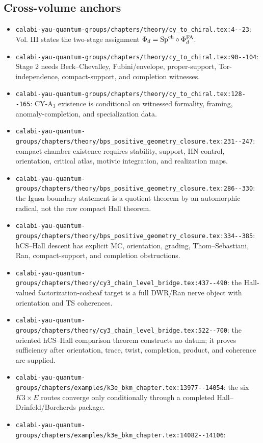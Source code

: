 \subsection{Cross-volume anchors}

\begin{itemize}
\item \verb|calabi-yau-quantum-groups/chapters/theory/cy_to_chiral.tex:4--23|:
Vol. III states the two-stage assignment
\(\Phi_d=\mathrm{Sp}^{\mathrm{ch}}\circ\Phi^{\mathrm{FA}}_d\).
\item \verb|calabi-yau-quantum-groups/chapters/theory/cy_to_chiral.tex:90--104|:
Stage 2 needs Beck--Chevalley, Fubini/envelope, proper-support,
Tor-independence, compact-support, and completion witnesses.
\item \verb|calabi-yau-quantum-groups/chapters/theory/cy_to_chiral.tex:128--165|:
CY-A\(_3\) existence is conditional on witnessed formality, framing,
anomaly-completion, and specialization data.
\item \verb|calabi-yau-quantum-groups/chapters/theory/bps_positive_geometry_closure.tex:231--247|:
compact chamber existence requires stability, support, HN control,
orientation, critical atlas, motivic integration, and realization maps.
\item \verb|calabi-yau-quantum-groups/chapters/theory/bps_positive_geometry_closure.tex:286--330|:
the Igusa boundary statement is a quotient theorem by an automorphic
radical, not the raw compact Hall theorem.
\item \verb|calabi-yau-quantum-groups/chapters/theory/bps_positive_geometry_closure.tex:334--385|:
hCS--Hall descent has explicit MC, orientation, grading,
Thom--Sebastiani, Ran, compact-support, and completion obstructions.
\item \verb|calabi-yau-quantum-groups/chapters/theory/cy3_chain_level_bridge.tex:437--490|:
the Hall-valued factorization-cosheaf target is a full DWR/Ran nerve
object with orientation and TS coherences.
\item \verb|calabi-yau-quantum-groups/chapters/theory/cy3_chain_level_bridge.tex:522--700|:
the oriented hCS--Hall comparison theorem constructs no datum; it proves
sufficiency after orientation, trace, twist, completion, product, and
coherence are supplied.
\item \verb|calabi-yau-quantum-groups/chapters/examples/k3e_bkm_chapter.tex:13977--14054|:
the six \(K3\times E\) routes converge only conditionally through a
completed Hall--Drinfeld/Borcherds package.
\item \verb|calabi-yau-quantum-groups/chapters/examples/k3e_bkm_chapter.tex:14082--14106|:

\end{itemize}
